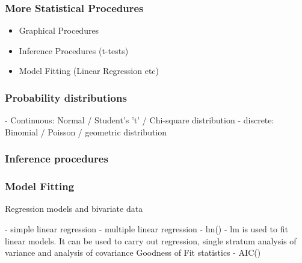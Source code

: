 \newpage
\frametitle{More Statistical Procedures}
\begin{itemize}
\item Graphical Procedures
\item Inference Procedures (t-tests)
\item Model Fitting (Linear Regression etc)
\end{itemize}

\frametitle{Probability distributions}
 - Continuous: Normal / Student's 't' / Chi-square distribution
 - discrete: Binomial / Poisson / geometric distribution

\frametitle{Inference procedures}

\frametitle{Model Fitting}
Regression models and bivariate data

 - simple linear regression
 - multiple linear regression
 - lm()
 - lm is used to fit linear models. It can be used to carry out regression, single stratum analysis of variance and analysis of covariance
Goodness of Fit statistics
 - AIC()


